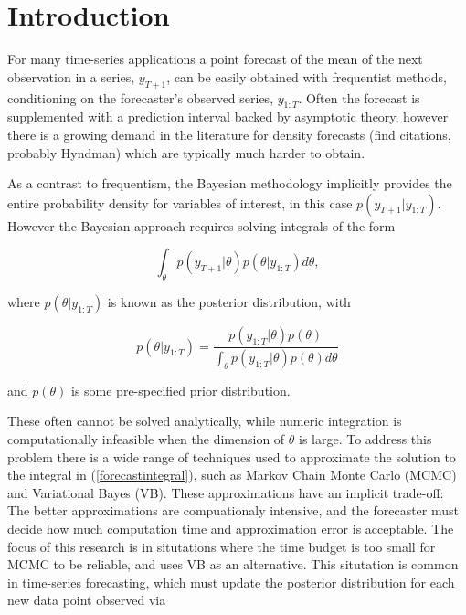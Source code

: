\documentclass{article}\usepackage[]{graphicx}\usepackage[]{color}
\numberwithin{equation}{section}
\begin{document}
\tableofcontents
\section{Introduction} 

For many time-series applications a point forecast of the mean of the next observation in a series, $y_{T+1}$, can be easily obtained with frequentist methods, conditioning on the forecaster's observed series, $y_{1:T}$. Often the forecast is supplemented with a prediction interval backed by asymptotic theory, however there is a growing demand in the literature for density forecasts (find citations, probably Hyndman) which are typically much harder to obtain. 

As a contrast to frequentism, the Bayesian methodology implicitly provides the entire probability density for variables of interest, in this case $p(y_{T+1} | y_{1:T})$. However the Bayesian approach requires solving integrals of the form 

\begin{equation}
\label{forecastintegral}
\int_\theta p(y_{T+1} | \theta) p(\theta | y_{1:T}) d \theta,
\end{equation}

where $p(\theta | y_{1:T})$ is known as the posterior distribution, with

\begin{equation}
\label{posterior}
 p(\theta | y_{1:T}) = \frac{p(y_{1:T}|\theta)p(\theta)}{\int_\theta p(y_{1:T}|\theta)p(\theta) d\theta}
\end{equation}

and $p(\theta)$ is some pre-specified prior distribution.

These often cannot be solved analytically, while numeric integration is computationally infeasible when the dimension of $\theta$ is large. To address this problem there is a wide range of techniques used to approximate the solution to the integral in (\ref{forecastintegral}), such as Markov Chain Monte Carlo (MCMC) and Variational Bayes (VB). These approximations have an implicit trade-off: The better approximations are compuationaly intensive, and the forecaster must decide how much computation time and approximation error is acceptable. The focus of this research is in situtations where the time budget is too small for MCMC to be reliable, and uses VB as an alternative. This situtation is common in time-series forecasting, which must update the posterior distribution for each new data point observed via
\end{document}
